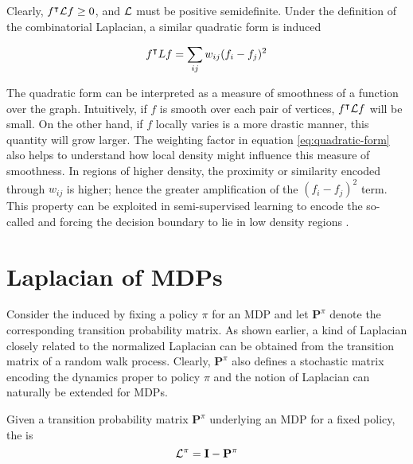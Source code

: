 Clearly, $f^\intercal \mathbf{\mathcal{L}} f \geq 0$, and $\mathbf{\mathcal{L}}$ must be positive
semidefinite. Under the definition of the combinatorial Laplacian, a similar quadratic
form is induced \cite{Mohar91}

\begin{equation}
f^\intercal L f = \sum_{ij} w_{ij} (f_i - f_j)^2
\end{equation}

The quadratic form can be interpreted as a measure of smoothness of a  function over
the graph. Intuitively, if $f$ is smooth over each pair of vertices, $f^\intercal
\mathbf{\mathcal{L}} f$ will be small. On the other hand, if $f$ locally varies is a more drastic
manner, this quantity will grow larger.  The weighting factor in equation
\ref{eq:quadratic-form} also helps to understand how local density might influence this
measure of smoothness. In regions of higher density, the proximity or similarity
encoded through $w_{ij}$ is higher; hence the greater amplification of the $(f_i - f_j)^2$
term. This property can be exploited in semi-supervised learning to encode the so-
called  and forcing the decision boundary to lie in low
density regions \cite{Chapelle2002}.


\section{Laplacian of MDPs}
Consider the \mrp induced by fixing a policy $\pi$ for an MDP and let $\mathbf{P}^\pi$
denote the corresponding transition probability matrix. As shown earlier, a kind of
Laplacian closely related to the normalized Laplacian can be obtained from the transition
matrix of a random walk process. Clearly, $\mathbf{P}^\pi$ also defines a stochastic
matrix encoding the dynamics proper to policy $\pi$ and the notion of Laplacian can
naturally be extended for MDPs. 

\begin{defn}
Given a transition probability matrix $\mathbf{P}^\pi$ underlying an MDP for a fixed
policy, the  is
\begin{equation}
\mathbf{\mathcal{L}}^\pi = \mathbf{I} - \mathbf{P}^\pi
\label{eq:mdp-graph-laplacian}
\end{equation}
\end{defn} 

